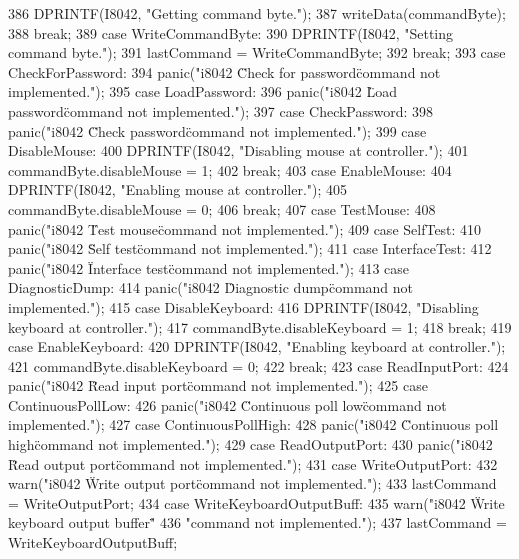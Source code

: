 \begin{DoxyCode}
{{{386             DPRINTF(I8042, "Getting command byte.\n");
387             writeData(commandByte);
388             break;
389           case WriteCommandByte:
390             DPRINTF(I8042, "Setting command byte.\n");
391             lastCommand = WriteCommandByte;
392             break;
393           case CheckForPassword:
394             panic("i8042 \"Check for password\" command not implemented.\n");
395           case LoadPassword:
396             panic("i8042 \"Load password\" command not implemented.\n");
397           case CheckPassword:
398             panic("i8042 \"Check password\" command not implemented.\n");
399           case DisableMouse:
400             DPRINTF(I8042, "Disabling mouse at controller.\n");
401             commandByte.disableMouse = 1;
402             break;
403           case EnableMouse:
404             DPRINTF(I8042, "Enabling mouse at controller.\n");
405             commandByte.disableMouse = 0;
406             break;
407           case TestMouse:
408             panic("i8042 \"Test mouse\" command not implemented.\n");
409           case SelfTest:
410             panic("i8042 \"Self test\" command not implemented.\n");
411           case InterfaceTest:
412             panic("i8042 \"Interface test\" command not implemented.\n");
413           case DiagnosticDump:
414             panic("i8042 \"Diagnostic dump\" command not implemented.\n");
415           case DisableKeyboard:
416             DPRINTF(I8042, "Disabling keyboard at controller.\n");
417             commandByte.disableKeyboard = 1;
418             break;
419           case EnableKeyboard:
420             DPRINTF(I8042, "Enabling keyboard at controller.\n");
421             commandByte.disableKeyboard = 0;
422             break;
423           case ReadInputPort:
424             panic("i8042 \"Read input port\" command not implemented.\n");
425           case ContinuousPollLow:
426             panic("i8042 \"Continuous poll low\" command not implemented.\n");
427           case ContinuousPollHigh:
428             panic("i8042 \"Continuous poll high\" command not implemented.\n");
429           case ReadOutputPort:
430             panic("i8042 \"Read output port\" command not implemented.\n");
431           case WriteOutputPort:
432             warn("i8042 \"Write output port\" command not implemented.\n");
433             lastCommand = WriteOutputPort;
434           case WriteKeyboardOutputBuff:
435             warn("i8042 \"Write keyboard output buffer\" "
436                     "command not implemented.\n");
437             lastCommand = WriteKeyboardOutputBuff;
}}}
\end{DoxyCode}
